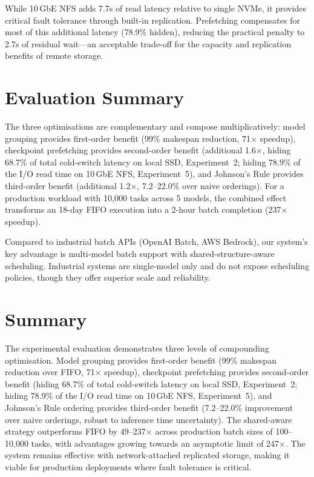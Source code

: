\documentclass[logo,bsc,singlespacing,parskip,online]{infthesis}
\begin{document}
While 10\,GbE NFS adds 7.7s of read latency relative to single NVMe, it provides critical fault tolerance through built-in replication. Prefetching compensates for most of this additional latency (78.9\% hidden), reducing the practical penalty to 2.7s of residual wait---an acceptable trade-off for the capacity and replication benefits of remote storage.


\section{Evaluation Summary}

The three optimisations are complementary and compose multiplicatively: model grouping provides first-order benefit (99\% makespan reduction, 71$\times$ speedup), checkpoint prefetching provides second-order benefit (additional 1.6$\times$, hiding 68.7\% of total cold-switch latency on local SSD, Experiment~2; hiding 78.9\% of the I/O read time on 10\,GbE NFS, Experiment~5), and Johnson's Rule provides third-order benefit (additional 1.2$\times$, 7.2--22.0\% over naive orderings). For a production workload with 10,000 tasks across 5 models, the combined effect transforms an 18-day FIFO execution into a 2-hour batch completion (237$\times$ speedup).

Compared to industrial batch APIs (OpenAI Batch, AWS Bedrock), our system's key advantage is multi-model batch support with shared-structure-aware scheduling. Industrial systems are single-model only and do not expose scheduling policies, though they offer superior scale and reliability.

\section{Summary}

The experimental evaluation demonstrates three levels of compounding optimisation. Model grouping provides first-order benefit (99\% makespan reduction over FIFO, 71$\times$ speedup), checkpoint prefetching provides second-order benefit (hiding 68.7\% of total cold-switch latency on local SSD, Experiment~2; hiding 78.9\% of the I/O read time on 10\,GbE NFS, Experiment~5), and Johnson's Rule ordering provides third-order benefit (7.2--22.0\% improvement over naive orderings, robust to inference time uncertainty). The shared-aware strategy outperforms FIFO by 49--237$\times$ across production batch sizes of 100--10,000 tasks, with advantages growing towards an asymptotic limit of 247$\times$. The system remains effective with network-attached replicated storage, making it viable for production deployments where fault tolerance is critical.
\end{document}
